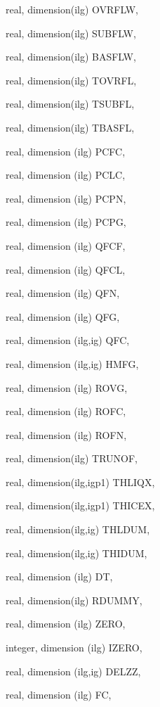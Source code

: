 {\begin{DoxyParamCaption}
\item[{real, dimension(ilg)}]{O\+V\+R\+F\+L\+W, }
\item[{real, dimension(ilg)}]{S\+U\+B\+F\+L\+W, }
\item[{real, dimension(ilg)}]{B\+A\+S\+F\+L\+W, }
\item[{real, dimension(ilg)}]{T\+O\+V\+R\+F\+L, }
\item[{real, dimension(ilg)}]{T\+S\+U\+B\+F\+L, }
\item[{real, dimension(ilg)}]{T\+B\+A\+S\+F\+L, }
\item[{real, dimension  (ilg)}]{P\+C\+F\+C, }
\item[{real, dimension  (ilg)}]{P\+C\+L\+C, }
\item[{real, dimension  (ilg)}]{P\+C\+P\+N, }
\item[{real, dimension  (ilg)}]{P\+C\+P\+G, }
\item[{real, dimension  (ilg)}]{Q\+F\+C\+F, }
\item[{real, dimension  (ilg)}]{Q\+F\+C\+L, }
\item[{real, dimension   (ilg)}]{Q\+F\+N, }
\item[{real, dimension   (ilg)}]{Q\+F\+G, }
\item[{real, dimension   (ilg,ig)}]{Q\+F\+C, }
\item[{real, dimension  (ilg,ig)}]{H\+M\+F\+G, }
\item[{real, dimension  (ilg)}]{R\+O\+V\+G, }
\item[{real, dimension  (ilg)}]{R\+O\+F\+C, }
\item[{real, dimension  (ilg)}]{R\+O\+F\+N, }
\item[{real, dimension(ilg)}]{T\+R\+U\+N\+O\+F, }
\item[{real, dimension(ilg,igp1)}]{T\+H\+L\+I\+Q\+X, }
\item[{real, dimension(ilg,igp1)}]{T\+H\+I\+C\+E\+X, }
\item[{real, dimension(ilg,ig)}]{T\+H\+L\+D\+U\+M, }
\item[{real, dimension(ilg,ig)}]{T\+H\+I\+D\+U\+M, }
\item[{real, dimension    (ilg)}]{D\+T, }
\item[{real, dimension(ilg)}]{R\+D\+U\+M\+M\+Y, }
\item[{real, dimension  (ilg)}]{Z\+E\+R\+O, }
\item[{integer, dimension (ilg)}]{I\+Z\+E\+R\+O, }
\item[{real, dimension (ilg,ig)}]{D\+E\+L\+Z\+Z, }
\item[{real, dimension    (ilg)}]{F\+C, }

\end{DoxyParamCaption}}
